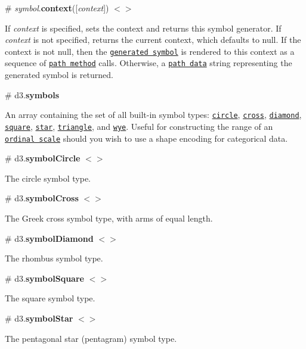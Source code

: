 \label{_symbol_context}%
\# {\itshape symbol}.{\bfseries context}(\mbox{[}{\itshape context}\mbox{]}) \href{https://github.com/d3/d3-shape/blob/master/src/symbol.js#L41}{\tt $<$$>$}

If {\itshape context} is specified, sets the context and returns this symbol generator. If {\itshape context} is not specified, returns the current context, which defaults to null. If the context is not null, then the \href{#_symbol}{\tt generated symbol} is rendered to this context as a sequence of \href{http://www.w3.org/TR/2dcontext/#canvaspathmethods}{\tt path method} calls. Otherwise, a \href{http://www.w3.org/TR/SVG/paths.html#PathData}{\tt path data} string representing the generated symbol is returned.

\label{_symbols}%
\# d3.{\bfseries symbols}

An array containing the set of all built-\/in symbol types\+: \href{#symbolCircle}{\tt circle}, \href{#symbolCross}{\tt cross}, \href{#symbolDiamond}{\tt diamond}, \href{#symbolSquare}{\tt square}, \href{#symbolStar}{\tt star}, \href{#symbolTriangle}{\tt triangle}, and \href{#symbolWye}{\tt wye}. Useful for constructing the range of an \href{https://github.com/d3/d3-scale#ordinal-scales}{\tt ordinal scale} should you wish to use a shape encoding for categorical data.

\label{_symbolCircle}%
\# d3.{\bfseries symbol\+Circle} \href{https://github.com/d3/d3-shape/blob/master/src/symbol/circle.js}{\tt $<$$>$}

The circle symbol type.

\label{_symbolCross}%
\# d3.{\bfseries symbol\+Cross} \href{https://github.com/d3/d3-shape/blob/master/src/symbol/cross.js}{\tt $<$$>$}

The Greek cross symbol type, with arms of equal length.

\label{_symbolDiamond}%
\# d3.{\bfseries symbol\+Diamond} \href{https://github.com/d3/d3-shape/blob/master/src/symbol/diamond.js}{\tt $<$$>$}

The rhombus symbol type.

\label{_symbolSquare}%
\# d3.{\bfseries symbol\+Square} \href{https://github.com/d3/d3-shape/blob/master/src/symbol/square.js}{\tt $<$$>$}

The square symbol type.

\label{_symbolStar}%
\# d3.{\bfseries symbol\+Star} \href{https://github.com/d3/d3-shape/blob/master/src/symbol/star.js}{\tt $<$$>$}

The pentagonal star (pentagram) symbol type.

